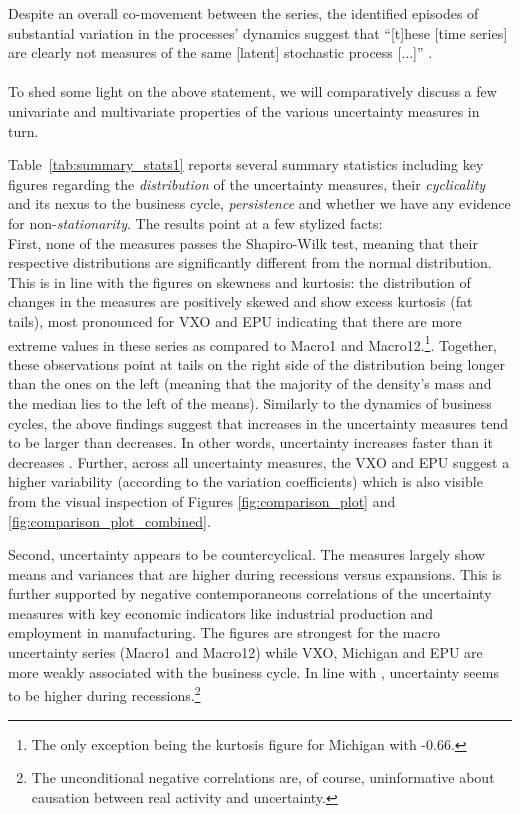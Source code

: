 \documentclass[a4paper,11pt,listof=nochaptergap,oneside,pointednumbers,bibtotoc,bigheadings,liststotoc]{scrbook}
\theoremstyle{mysatz}
\theoremstyle{mydefinition}
\theoremstyle{mybemerkung}
\begin{document}
Despite an overall co-movement between the series, the identified episodes of substantial variation in the processes' dynamics suggest that ``[t]hese [time series] are clearly not measures of the same [latent] stochastic process [...]'' \citep[p. ]{orlikandveldkamp:14}.\\
\\
To shed some light on the above statement, we will comparatively discuss a few univariate and multivariate properties of the various uncertainty measures in turn.

Table~\ref{tab:summary_stats1} reports several summary statistics including key figures regarding the \textit{distribution} of the uncertainty measures, their \textit{cyclicality} and its nexus to the business cycle, \textit{persistence} and whether we have any evidence for non-\textit{stationarity}. The results point at a few stylized facts:\\
First, none of the measures passes the Shapiro-Wilk test, meaning that their respective distributions are significantly different from the normal distribution. This is in line with the figures on skewness and kurtosis: the distribution of changes in the measures are positively skewed and show excess kurtosis (fat tails), most pronounced for VXO and EPU indicating that there are more extreme values in these series as compared to Macro1 and Macro12.\footnote{The only exception being the kurtosis figure for Michigan with -0.66.}. Together, these observations point at tails on the right side of the distribution being longer than the ones on the left (meaning that the majority of the density's mass and the median lies to the left of the means). Similarly to the dynamics of business cycles, the above findings suggest that increases in the uncertainty measures tend to be larger than decreases. In other words, uncertainty increases faster than it decreases \citep{moore:17}. Further, across all uncertainty measures, the VXO and EPU suggest a higher variability (according to the variation coefficients) which is also visible from the visual inspection of Figures \ref{fig:comparison_plot} and \ref{fig:comparison_plot_combined}.

Second, uncertainty appears to be countercyclical. The measures largely show means and variances that are higher during recessions versus expansions. This is further supported by negative contemporaneous correlations of the uncertainty measures with key economic indicators like industrial production and employment in manufacturing. The figures are strongest for the macro uncertainty series (Macro1 and Macro12) while VXO, Michigan and EPU are more weakly associated with the business cycle. In line with \citet{bloom:14}, uncertainty seems to be higher during recessions.\footnote{The unconditional negative correlations are, of course, uninformative about causation between real activity and uncertainty.}
\end{document}
